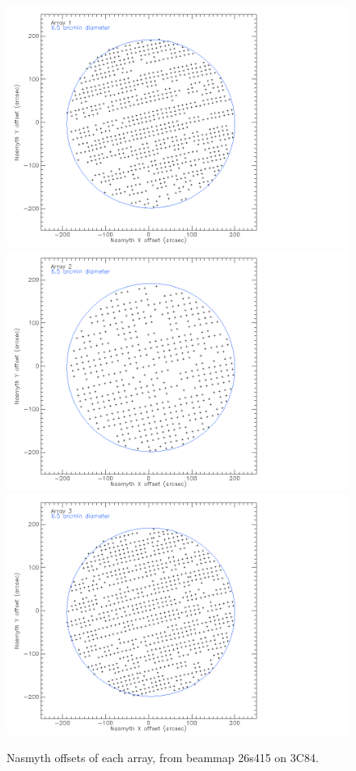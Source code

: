 \documentclass[a4paper, 11pt]{article} %
\begin{document}
\begin{figure}
\begin{center}
\includegraphics[clip, angle=0, scale = 0.15]{Figures/FOV_A1.png}
\includegraphics[clip, angle=0, scale = 0.15]{Figures/FOV_A2.png}
\includegraphics[clip, angle=0, scale = 0.15]{Figures/FOV_A3.png}
\caption{Nasmyth offsets of each array, from beammap 26s415 on 3C84.}
\label{fig:fov}
\end{center}
\end{figure}
\end{document}
